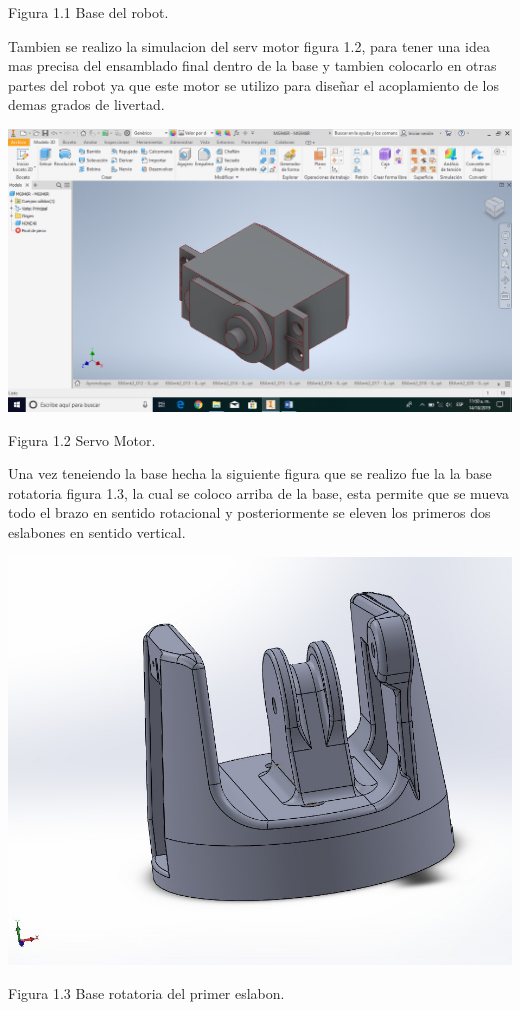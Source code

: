 \documentclass[12pt,letterpaper]{article}
\begin{document}
\begin{center}
Figura 1.1 Base del robot.
\end{center}
\newpage
\begin{flushleft}
Tambien se realizo la simulacion del serv motor figura 1.2, para tener una idea mas precisa del ensamblado final dentro de la base y tambien colocarlo en otras partes del robot ya que este motor se utilizo para diseñar el acoplamiento de los demas grados de livertad.
\end{flushleft}
\begin{center}
\includegraphics[scale=0.4]{imag10.png} 
\end{center}
\begin{center}
Figura 1.2 Servo Motor.
\end{center}
\begin{flushleft}
Una vez teneiendo la base hecha la siguiente figura que se realizo fue la la base rotatoria figura 1.3, la cual se coloco arriba de la base, esta permite que se mueva todo el brazo en sentido rotacional y posteriormente se eleven los primeros dos eslabones en sentido vertical.
\end{flushleft}
\begin{center}
\includegraphics[scale=0.4]{img11.jpg} 
\end{center}
\begin{center}
Figura 1.3 Base rotatoria del primer eslabon.
\end{center}
\end{document}
